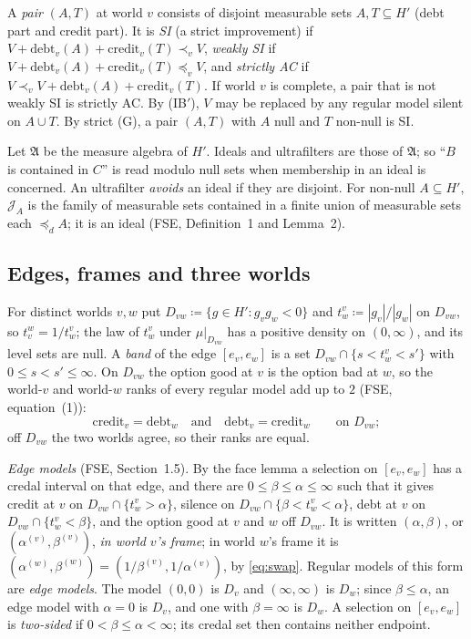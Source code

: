 \documentclass[11pt]{article}
\theoremstyle{definition}\newtheorem{definition}[theorem]{Definition}
\theoremstyle{remark}\newtheorem{remark}[theorem]{Remark}
\newcommand{\debt}{\mathrm{debt}}
\newcommand{\cred}{\mathrm{credit}}
\newcommand{\Jid}{\mathcal J}
\newcommand{\Alg}{\mathfrak A}
\begin{document}
A \emph{pair} $(A,T)$ at world $v$ consists of disjoint measurable sets
$A,T\subseteq H'$ (debt part and credit part). It is \emph{SI} (a strict
improvement) if $V+\debt_v(A)+\cred_v(T)\prec_vV$,
\emph{weakly SI} if $V+\debt_v(A)+\cred_v(T)\preceq_vV$, and \emph{strictly
AC} if $V\prec_vV+\debt_v(A)+\cred_v(T)$. If world $v$ is complete, a pair
that is not weakly SI is strictly AC. By (IB$'$), $V$ may be replaced by any
regular model silent on $A\cup T$. By strict (G), a pair $(A,T)$ with $A$
null and $T$ non-null is SI.

Let $\Alg$ be the measure algebra of $H'$. Ideals and ultrafilters are those
of $\Alg$; so ``$B$ is contained in $C$'' is read modulo null sets when
membership in an ideal is concerned. An ultrafilter \emph{avoids} an ideal if
they are disjoint. For non-null $A\subseteq H'$, $\Jid_A$ is the family of
measurable sets contained in a finite union of measurable sets each
$\preceq_dA$; it is an ideal (FSE, Definition~1 and Lemma~2).

\subsection{Edges, frames and three worlds}\label{sec:three}

For distinct worlds $v,w$ put $D_{vw}\coloneqq\{g\in H':g_vg_w<0\}$ and
$t^v_w\coloneqq|g_v|/|g_w|$ on $D_{vw}$, so $t^w_v=1/t^v_w$; the law of
$t^v_w$ under $\mu|_{D_{vw}}$ has a positive density on $(0,\infty)$, and
its level sets are null. A \emph{band} of the edge $[e_v,e_w]$ is a set
$D_{vw}\cap\{s<t^v_w<s'\}$ with $0\le s<s'\le\infty$. On $D_{vw}$ the
option good at $v$ is the option bad at $w$, so the world-$v$ and world-$w$
ranks of every regular model add up to $2$ (FSE, equation~(1)):
\begin{equation}
 \cred_v=\debt_w\quad\text{and}\quad\debt_v=\cred_w\qquad\text{on }D_{vw};
 \label{eq:swap}
\end{equation}
off $D_{vw}$ the two worlds agree, so their ranks are equal.

\emph{Edge models} (FSE, Section~1.5). By the face lemma a selection on
$[e_v,e_w]$ has a credal interval on that edge, and there are
$0\le\beta\le\alpha\le\infty$ such that it gives credit at $v$ on
$D_{vw}\cap\{t^v_w>\alpha\}$, silence on $D_{vw}\cap\{\beta<t^v_w<\alpha\}$,
debt at $v$ on $D_{vw}\cap\{t^v_w<\beta\}$, and the option good at $v$ and
$w$ off $D_{vw}$. It is written $(\alpha,\beta)$, or
$(\alpha^{(v)},\beta^{(v)})$, \emph{in world $v$'s frame}; in world $w$'s
frame it is $(\alpha^{(w)},\beta^{(w)})=(1/\beta^{(v)},1/\alpha^{(v)})$, by
\eqref{eq:swap}. Regular models of this form are \emph{edge models}. The
model $(0,0)$ is $D_v$ and $(\infty,\infty)$ is $D_w$; since $\beta\le\alpha$,
an edge model with $\alpha=0$ is $D_v$, and one with $\beta=\infty$ is $D_w$.
A selection on $[e_v,e_w]$ is \emph{two-sided} if $0<\beta\le\alpha<\infty$;
its credal set then contains neither endpoint.
\end{document}
